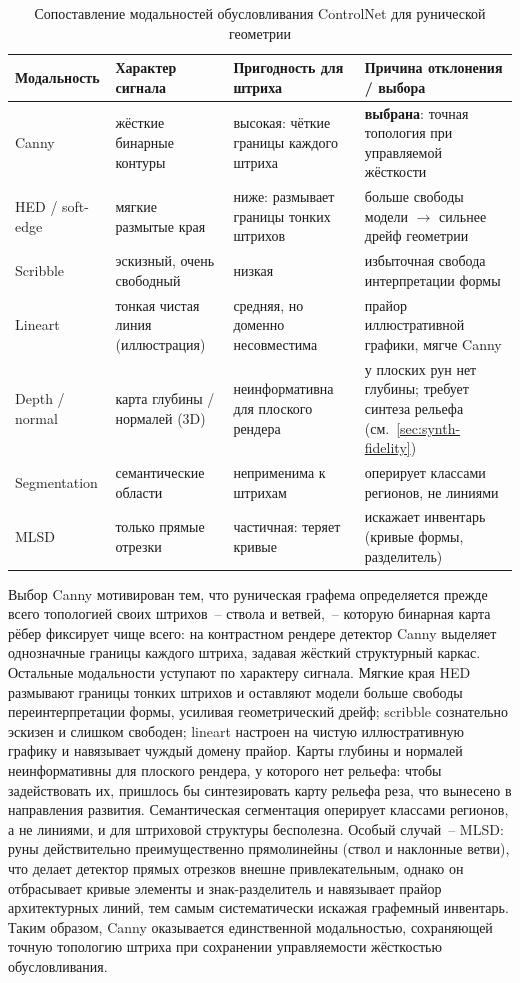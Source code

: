 \documentclass[a4paper,12pt]{extarticle}
\begin{document}
\begin{table}[htbp]
\centering
\caption{Сопоставление модальностей обусловливания ControlNet для рунической геометрии}
\label{tab:controlnet-modalities}
\small
\begin{tabular}{p{2.6cm} p{3.4cm} p{3.0cm} p{4.0cm}}
\hline
\textbf{Модальность} & \textbf{Характер сигнала} & \textbf{Пригодность для штриха} & \textbf{Причина отклонения / выбора} \\
\hline
Canny & жёсткие бинарные контуры & высокая: чёткие границы каждого штриха & \textbf{выбрана}: точная топология при управляемой жёсткости \\
HED / soft-edge & мягкие размытые края & ниже: размывает границы тонких штрихов & больше свободы модели $\to$ сильнее дрейф геометрии \\
Scribble & эскизный, очень свободный & низкая & избыточная свобода интерпретации формы \\
Lineart & тонкая чистая линия (иллюстрация) & средняя, но доменно несовместима & прайор иллюстративной графики, мягче Canny \\
Depth / normal & карта глубины / нормалей (3D) & неинформативна для плоского рендера & у плоских рун нет глубины; требует синтеза рельефа (см.\ \ref{sec:synth-fidelity}) \\
Segmentation & семантические области & неприменима к штрихам & оперирует классами регионов, не линиями \\
MLSD & только прямые отрезки & частичная: теряет кривые & искажает инвентарь (кривые формы, разделитель) \\
\hline
\end{tabular}
\end{table}
 
Выбор Canny мотивирован тем, что руническая графема определяется прежде всего топологией своих штрихов~-- ствола и ветвей,~-- которую бинарная карта рёбер фиксирует чище всего: на контрастном рендере детектор Canny выделяет однозначные границы каждого штриха, задавая жёсткий структурный каркас. Остальные модальности уступают по характеру сигнала. Мягкие края HED размывают границы тонких штрихов и оставляют модели больше свободы переинтерпретации формы, усиливая геометрический дрейф; scribble сознательно эскизен и слишком свободен; lineart настроен на чистую иллюстративную графику и навязывает чуждый домену прайор. Карты глубины и нормалей неинформативны для плоского рендера, у которого нет рельефа: чтобы задействовать их, пришлось бы синтезировать карту рельефа реза, что вынесено в направления развития. Семантическая сегментация оперирует классами регионов, а не линиями, и для штриховой структуры бесполезна. Особый случай~-- MLSD: руны действительно преимущественно прямолинейны (ствол и наклонные ветви), что делает детектор прямых отрезков внешне привлекательным, однако он отбрасывает кривые элементы и знак-разделитель и навязывает прайор архитектурных линий, тем самым систематически искажая графемный инвентарь. Таким образом, Canny оказывается единственной модальностью, сохраняющей точную топологию штриха при сохранении управляемости жёсткостью обусловливания.
 
\end{document}
